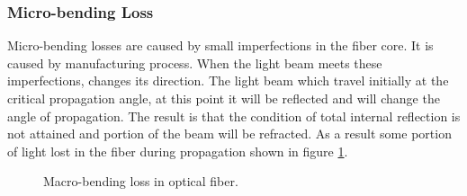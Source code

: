 \documentclass[12pt]{report}
\begin{document}
		\subsubsection{Micro-bending Loss}
	Micro-bending losses are caused by small imperfections in the fiber core. It is caused by manufacturing process. When the light beam meets these imperfections, changes its direction. The light beam which travel initially at the critical propagation angle, at this point it will be reflected and will change the angle of propagation. The result is that the condition of total internal reflection is not attained and portion of the beam will be refracted. As a result some portion of light lost in the fiber during propagation shown in figure \ref{fig:micro_benidng}.
	\begin{figure}[htbp]
		\caption{Macro-bending loss in optical fiber.}
		\label{fig:micro_benidng}
	\end{figure}
\end{document}
